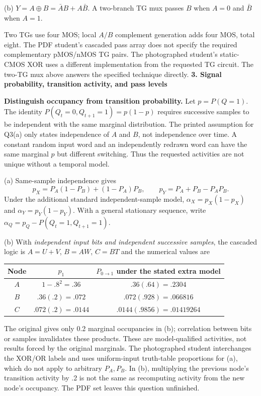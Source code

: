 \documentclass[10pt]{article}
\begin{document}
(b) $Y=A\oplus B=\bar A B+A\bar B$. A two-branch TG mux passes $B$ when $A=0$ and $\bar B$ when $A=1$.
\begin{center}\end{center}
Two TGs use four MOS; local $A/B$ complement generation adds four MOS, total eight. The PDF student's cascaded pass array does not specify the required complementary pMOS/nMOS TG pairs. The photographed student's static-CMOS XOR uses a different implementation from the requested TG circuit. The two-TG mux above answers the specified technique directly.
\newpage
\textbf{3. Signal probability, transition activity, and pass levels}

\textbf{Distinguish occupancy from transition probability.} Let $p=P(Q=1)$. The identity $P(Q_t=0,Q_{t+1}=1)=p(1-p)$ requires successive samples to be independent with the same marginal distribution. The printed assumption for Q3(a) only states independence of $A$ and $B$, not independence over time. A constant random input word and an independently redrawn word can have the same marginal $p$ but different switching. Thus the requested activities are not unique without a temporal model.

(a) Same-sample independence gives
\[p_X=P_A(1-P_B)+(1-P_A)P_B,\qquad p_Y=P_A+P_B-P_AP_B.\]
Under the additional standard independent-sample model, $\alpha_X=p_X(1-p_X)$ and $\alpha_Y=p_Y(1-p_Y)$. With a general stationary sequence, write $\alpha_Q=p_Q-P(Q_t=1,Q_{t+1}=1)$.

(b) With \emph{independent input bits and independent successive samples}, the cascaded logic is $A=U+V$, $B=AW$, $C=BT$ and the numerical values are
\begin{center}\begin{tabular}{ccc}\toprule Node&$p_1$&$P_{0\to1}$ under the stated extra model\\\midrule
$A$&$1-.8^2=.36$&$.36(.64)=.2304$\\
$B$&$.36(.2)=.072$&$.072(.928)=.066816$\\
$C$&$.072(.2)=.0144$&$.0144(.9856)=.01419264$\\\bottomrule\end{tabular}\end{center}
The original gives only 0.2 marginal occupancies in (b); correlation between bits or samples invalidates these products. These are model-qualified activities, not results forced by the original marginals. The photographed student interchanges the XOR/OR labels and uses uniform-input truth-table proportions for (a), which do not apply to arbitrary $P_A,P_B$. In (b), multiplying the previous node's transition activity by .2 is not the same as recomputing activity from the new node's occupancy. The PDF set leaves this question unfinished.
\end{document}
